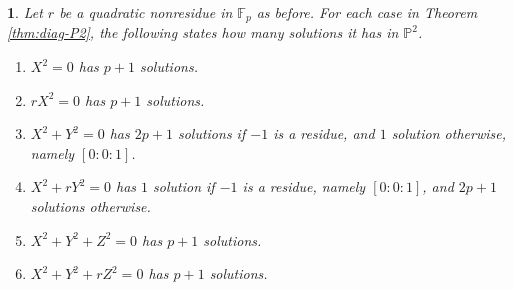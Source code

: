 \documentclass[10pt,a4paper]{amsart}
\numberwithin{equation}{section}
\numberwithin{figure}{section}
\theoremstyle{definition}
\theoremstyle{remark}
\theoremstyle{plain}
\theoremstyle{plain}
\theoremstyle{definition}
\theoremstyle{plain}
\newtheorem{prop}{\protect\propositionname}[section]
\theoremstyle{plain}
\providecommand{\propositionname}{Proposition}
\renewcommand{\P}{\mathbb{P}}
\newcommand{\F}{\mathbb{F}}
\begin{document}
	\begin{prop}\label{prop:counting-P2-solutions}
		Let $r$ be a quadratic nonresidue in $\F_p$ as before. For each case in Theorem \ref{thm:diag-P2}, the following states how many solutions it has in $\P^2$. 
		\begin{enumerate} 
			\item\label{case:rank1_x^2=0} $X^2 = 0$ has $p+1$ solutions.
			\item\label{case:rank1_rx^2=0} $rX^2 = 0$ has $p+1$ solutions.
			\item\label{case:rank2_x^2+y^2=0} $X^2 + Y^2 = 0$ has $2p+1$ solutions if $-1$ is a residue, and $1$ solution otherwise, namely $[0:0:1]$.
			\item\label{case:rank2_x^2+ry^2=0} $X^2 + rY^2 = 0$ has $1$ solution if $-1$ is a residue, namely $[0:0:1]$, and $2p+1$ solutions otherwise.
			\item\label{case:rank3_x^2+y^2+z^2=0} $X^2 + Y^2 + Z^2 = 0$ has $p+1$ solutions.
			\item\label{case:rank3_x^2+y^2+rz^2=0} $X^2 + Y^2 + rZ^2 = 0$ has $p+1$ solutions.
		\end{enumerate}
	\end{prop}
\end{document}
